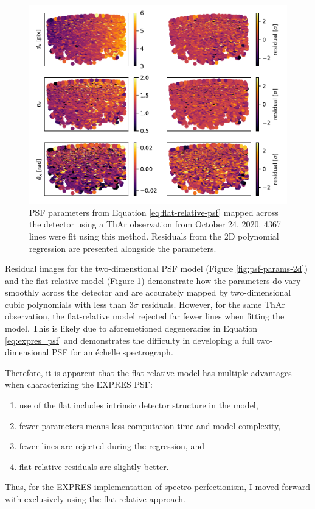 \begin{figure}
    \centering
    \includegraphics[width=\textwidth]{figures-5/psf-params-1d.pdf}
    \caption[EXPRES flat-relative point spread function model parameters]{PSF parameters from Equation \ref{eq:flat-relative-psf} mapped across the detector using a ThAr observation from October 24, 2020. 4367 lines were fit using this method. Residuals from the 2D polynomial regression are presented alongside the parameters.}
    \label{fig:psf-params-1d}
\end{figure}

Residual images for the two-dimenstional PSF model (Figure \ref{fig:psf-params-2d}) and the flat-relative model (Figure \ref{fig:psf-params-1d}) demonstrate how the parameters do vary smoothly across the detector and are accurately mapped by two-dimensional cubic polynomials with less than $3\sigma$ residuals. However, for the same ThAr observation, the flat-relative model rejected far fewer lines when fitting the model. This is likely due to aforemetioned degeneracies in Equation \ref{eq:expres_psf} and demonstrates the difficulty in developing a full two-dimensional PSF for an \'{e}chelle spectrograph.

Therefore, it is apparent that the flat-relative model has multiple advantages when characterizing the EXPRES PSF:
\begin{enumerate}
    \item use of the flat includes intrinsic detector structure in the model,
    \item fewer parameters means less computation time and model complexity,
    \item fewer lines are rejected during the regression, and
    \item flat-relative residuals are slightly better.
\end{enumerate}
Thus, for the EXPRES implementation of spectro-perfectionism, I moved forward with exclusively using the flat-relative approach.

